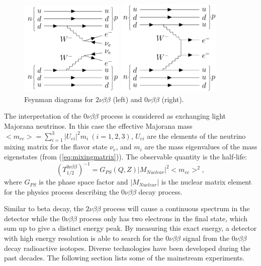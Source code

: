 \begin{figure}[htbp]
	\centering	
	\begin{minipage}[t]{0.45\textwidth}
		\includegraphics[width=5cm]{doubleBeta2nu_feynman.png}
	\end{minipage}
	\begin{minipage}[t]{0.45\textwidth}
		\includegraphics[width=5cm]{doubleBeta_feynman.png}
	\end{minipage}
	\caption{ Feynman diagrams for $2\nu\beta\beta$ (left) and $0\nu\beta\beta$ (right).}
	\label{feynman1}
\end{figure}

The interpretation of the $0\nu\beta\beta$ process is considered as exchanging light Majorana neutrinos. In this case the effective Majorana mass $<m_{ee}>=\sum_{i=1}^{3} |U_{ei}|^2m_i~(i=1,2,3)$, $U_{ei}$ are the elements of the neutrino mixing matrix for the flavor state $\nu_e$, and $m_i$ are the mass eigenvalues of the mass eigenstates (from (\ref{eq:mixingmatrix})). The observable quantity is the half-life:
\[
(T^{0\nu\beta\beta}_{1/2})^{-1} = G_{PS}(Q,Z)|M_{Nuclear}|^2<m_{ee}>^2, 
\]
where $G_{PS}$ is the phase space factor and $|M_{Nuclear}|$ is the nuclear matrix element for the physics process describing the $0\nu\beta\beta$ decay process\cite{zuber2011neutrino}.

Similar to beta decay, the $2\nu\beta\beta$ process will cause a continuous spectrum in the detector while the $0\nu\beta\beta$ process only has two electrons in the final state, which sum up to give a distinct energy peak. By measuring this exact energy, a detector with high energy resolution is able to search for the $0\nu\beta\beta$ signal from the $0\nu\beta\beta$ decay radioactive isotopes. Diverse technologies have been developed during the past decades. The following section lists some of the mainstream experiments.

